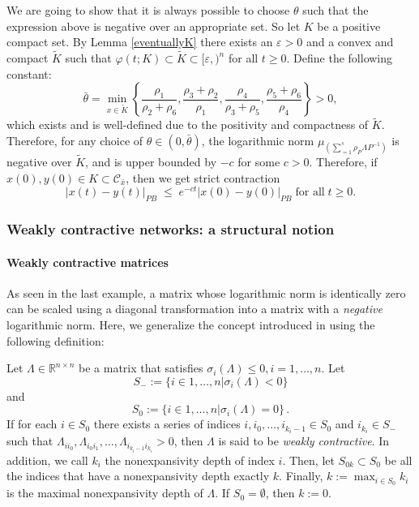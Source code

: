 \documentclass[onefignum,onetabnum]{siamonline220329}
\newcommand\bx{{\bar x}}
\newcommand{\Cs}{\mathscr C}
\newcommand\ve{\varepsilon}
\newcommand{\wt}{\widetilde}
\def\ell{}%
\def\infty{}%
\begin{document}
{We are going to show that it is always possible to choose $\theta$ such that the expression above is negative over an appropriate set. So let $K$ be a positive compact set.  By Lemma \ref{eventuallyK} there exists an $\ve>0$ and a convex and compact $\wt K$ such that $\varphi(t;K){\subset} \wt K \subset [\ve,\infty)^n$ for all $t\ge0$.  Define the following constant:
\[ \bar\theta=\min_{x\in\wt K}\left\{ \frac{\rho_1}{\rho_2+\rho_6}, \frac{\rho_{3}+\rho_2}{\rho_1}, \frac{\rho_4}{\rho_3+\rho_5}, \frac{\rho_5+\rho_6}{\rho_4}\right\}>0, \]
which exists and is well-defined due to the positivity and compactness of $\wt K$. Therefore, for any choice of $\theta \in (0,\bar\theta)$, the logarithmic norm  $\mu_\infty\left(\sum_{\ell=1}^s \rho_\ell P\Lambda_{\ell} P^{-1}\right)$ is negative over $\wt K$, and is upper bounded by $-c$ for some $c>0$. Therefore,   if $x(0),y(0) \in K \subset \Cs_\bx$, then we get strict contraction
\[
|{x(t)-y(t)}|_{PB} \;\leq\; e^{-ct} |{x(0)-y(0)}|_{PB} \; \mbox{for all}\; t\geq0.
\]

\subsubsection{Weakly contractive networks: a structural notion} \label{s.weakcontraction}
\paragraph{Weakly contractive matrices} As seen in the last example, a matrix whose logarithmic norm is identically zero can be scaled using a diagonal transformation into a matrix with a \emph{negative} logarithmic norm. Here, we generalize the concept introduced in \cite{margaliot14} using the following definition:
\begin{definition}\label{def.weakcontract}
Let ${\Lambda} \in \mathbb R^{n\times n}$ be {a} matrix that satisfies $\sigma_i(\Lambda)\le 0, i=1,\dots,n$. Let
\[
S_-:= \{ i \in{1,\dots,n} | \sigma_i(\Lambda)<0  \}
\]
and
\[
S_0:= \{ i \in{1,\dots,n} | \sigma_i(\Lambda)=0  \} \,.
\]
If for each $i\in S_0$ there exists a series of indices $i,i_0,\dots,i_{k_i-1} \in S_0$ and $i_{k_i} \in S_-$ such that ${\Lambda}_{ii_0},{\Lambda}_{i_0i_1},\dots,{\Lambda}_{i_{k_i-1}i_{k_i}}>0$, then $\Lambda$ is said to be \emph{weakly contractive}. In addition, we call $k_i$ the nonexpansivity depth of index $i$. Then, let $S_{0k} \subset S_0$ be all the indices that have a nonexpansivity depth exactly $k$. Finally, $k:=\max_{i \in S_0} k_i$ is the maximal nonexpansivity depth of $\Lambda$.  If $S_0 = \emptyset$, then $k:=0$.
\end{definition}

}
\end{document}
